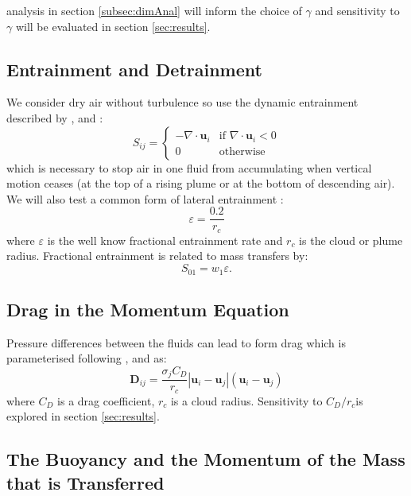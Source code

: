 \documentclass[draft]{agujournal2019}
\begin{document}
 analysis in section
\ref{subsec:dimAnal} will inform the choice of $\gamma$ and sensitivity
to $\gamma$ will be evaluated in section \ref{sec:results}.

\subsection{Entrainment and Detrainment \label{subsec:Sij}}

We consider dry air without turbulence so use the dynamic entrainment
described by , and :
\begin{equation}
S_{ij}=\begin{cases}
-\nabla\cdot\mathbf{u}_{i} & \text{if }\nabla\cdot\mathbf{u}_{i}<0\\
0 & \text{otherwise}
\end{cases}
\end{equation}
which is necessary to stop air in one fluid from accumulating when
vertical motion ceases (at the top of a rising plume or at the bottom
of descending air). We will also test a common form of lateral entrainment
\cite{DBF+13}:
\begin{equation}
\varepsilon=\frac{0.2}{r_{c}}
\end{equation}
where $\varepsilon$ is the well know fractional entrainment rate
and $r_{c}$ is the cloud or plume radius. Fractional entrainment is related to mass transfers by:
\begin{equation}
S_{01} = w_{1}\varepsilon.
\end{equation}

\subsection{Drag in the Momentum Equation\label{subsec:drag}}

Pressure differences between the fluids can lead to form drag which
is parameterised following ,  and  as: 
\begin{equation}
\mathbf{D}_{ij}=\frac{\sigma_{j}C_{D}}{r_{c}}|\mathbf{u}_{i}-\mathbf{u}_{j}|\left(\mathbf{u}_{i}-\mathbf{u}_{j}\right)\label{eq:dragBubble}
\end{equation}
where $C_{D}$ is a drag coefficient, $r_{c}$ is a cloud radius.
Sensitivity to $C_{D}/r_{c}$is explored in section \ref{sec:results}. 

\subsection{The Buoyancy and the Momentum of the Mass that is Transferred \label{subsec:transferProperties}}
\end{document}
